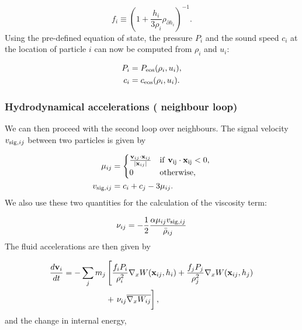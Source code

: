 \begin{equation}
  f_i \equiv \left(1 + \frac{h_i}{3\rho_i}\rho_{\partial h_i}
  \right)^{-1}.
  \label{eq:sph:minimal:f_i}
\end{equation}
Using the pre-defined equation of state, the pressure $P_i$ and the sound
speed $c_i$ at the location of particle $i$ can now be computed from
$\rho_i$ and $u_i$:

\begin{align}
  P_i &= P_{\rm eos}(\rho_i, u_i),   \label{eq:sph:minimal:P}\\
  c_i &= c_{\rm eos}(\rho_i, u_i).   \label{eq:sph:minimal:c}
\end{align}

\subsubsection{Hydrodynamical accelerations ( neighbour loop)}

We can then proceed with the second loop over
neighbours. The signal velocity $v_{{\rm sig},ij}$ between two particles is given by

\begin{align}
  \mu_{ij} &=
  \begin{cases}
  \frac{\vec{v}_{ij} \cdot \vec{x}_{ij}}{|\vec{x}_{ij}|}  & \rm{if}~
  \vec{v}_{ij} \cdot \vec{x}_{ij} < 0,\\
    0 &\rm{otherwise}, \\
  \end{cases}\nonumber\\
  v_{{\rm sig},ij} &= c_i + c_j - 3\mu_{ij}.   \label{eq:sph:minimal:v_sig}
\end{align}
We also use these two quantities for the calculation of the viscosity term:

\begin{equation}
\nu_{ij} = -\frac{1}{2}\frac{\alpha \mu_{ij} v_{{\rm
      sig},ij}}{\bar\rho_{ij}}
  \label{eq:sph:minimal:nu_ij}
\end{equation}
The fluid accelerations are then given by

\begin{align}
  \frac{d\vec{v}_i}{dt} = -\sum_j m_j &\left[\frac{f_iP_i}{\rho_i^2}
  \nabla_x W(\vec{x}_{ij}, h_i)   \nonumber
  +\frac{f_jP_j}{\rho_j^2}\nabla_x W(\vec{x}_{ij},h_j)\right. \\
  &+ \left. \bigg.\nu_{ij} \Wij \right], \label{eq:sph:minimal:dv_dt}
\end{align}
and the change in internal energy,

